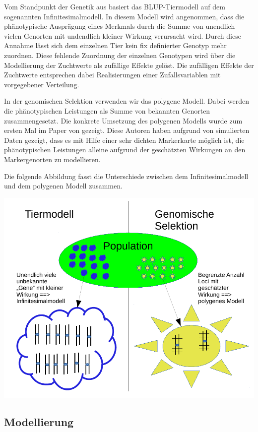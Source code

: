 \documentclass[]{book}
\begin{document}
Vom Standpunkt der Genetik aus basiert das BLUP-Tiermodell auf dem
sogenannten Infinitesimalmodell. In diesem Modell wird angenommen, dass
die phänotypische Ausprägung eines Merkmals durch die Summe von
unendlich vielen Genorten mit undendlich kleiner Wirkung verursacht
wird. Durch diese Annahme lässt sich dem einzelnen Tier kein fix
definierter Genotyp mehr zuordnen. Diese fehlende Zuordnung der
einzelnen Genotypen wird über die Modellierung der Zuchtwerte als
zufällige Effekte gelöst. Die zufälligen Effekte der Zuchtwerte
entsprechen dabei Realisierungen einer Zufallsvariablen mit vorgegebener
Verteilung.

In der genomischen Selektion verwenden wir das polygene Modell. Dabei
werden die phänotypischen Leistungen als Summe von bekannten Genorten
zusammengesetzt. Die konkrete Umsetzung des polygenen Modells wurde zum
ersten Mal im Paper von \citep{MHG2001} gezeigt. Diese Autoren haben
aufgrund von simulierten Daten gezeigt, dass es mit Hilfe einer sehr
dichten Markerkarte möglich ist, die phänotypischen Leistungen alleine
aufgrund der geschätzten Wirkungen an den Markergenorten zu modellieren.

Die folgende Abbildung fasst die Unterschiede zwischen dem
Infinitesimalmodell und dem polygenen Modell zusammen.

\begin{center}\includegraphics{AnimalModelVsGenomicSelection} \end{center}

\subsection{Modellierung}\label{modellierung}
\end{document}
